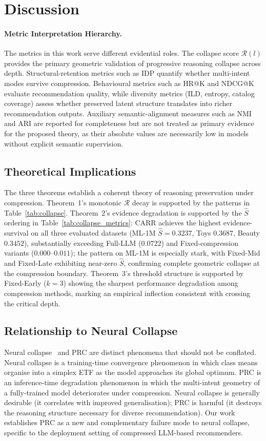 \documentclass[lettersize,journal]{IEEEtran}
\begin{document}
\section{Discussion}

\paragraph{Metric Interpretation Hierarchy.}
The metrics in this work serve different evidential roles. The collapse score $\mathcal{R}(l)$ provides the primary geometric validation of progressive reasoning collapse across depth. Structural-retention metrics such as IDP quantify whether multi-intent modes survive compression. Behavioural metrics such as HR@K and NDCG@K evaluate recommendation quality, while diversity metrics (ILD, entropy, catalog coverage) assess whether preserved latent structure translates into richer recommendation outputs. Auxiliary semantic-alignment measures such as NMI and ARI are reported for completeness but are not treated as primary evidence for the proposed theory, as their absolute values are necessarily low in models without explicit semantic supervision.

\subsection{Theoretical Implications}
The three theorems establish a coherent theory of reasoning preservation under compression. Theorem~1's monotonic $\mathcal{R}$ decay is supported by the patterns in Table~\ref{tab:collapse}. Theorem~2's evidence degradation is supported by the $\widehat{S}$ ordering in Table~\ref{tab:collapse_metrics}: CARR achieves the highest evidence-survival on all three evaluated datasets (ML-1M $\widehat{S}=0.3237$, Toys $0.3687$, Beauty $0.3452$), substantially exceeding Full-LLM ($0.0722$) and Fixed-compression variants ($0.000$--$0.011$); the pattern on ML-1M is especially stark, with Fixed-Mid and Fixed-Late exhibiting near-zero $\widehat{S}$, confirming complete geometric collapse at the compression boundary. Theorem~3's threshold structure is supported by Fixed-Early ($k=3$) showing the sharpest performance degradation among compression methods, marking an empirical inflection consistent with crossing the critical depth.

\subsection{Relationship to Neural Collapse}
Neural collapse~\cite{papyan2020prevalence} and PRC are distinct phenomena that should not be conflated. Neural collapse is a training-time convergence phenomenon in which class means organise into a simplex ETF as the model approaches its global optimum. PRC is an inference-time degradation phenomenon in which the multi-intent geometry of a fully-trained model deteriorates under compression. Neural collapse is generally desirable (it correlates with improved generalisation); PRC is harmful (it destroys the reasoning structure necessary for diverse recommendation). Our work establishes PRC as a new and complementary failure mode to neural collapse, specific to the deployment setting of compressed LLM-based recommenders.
\end{document}

